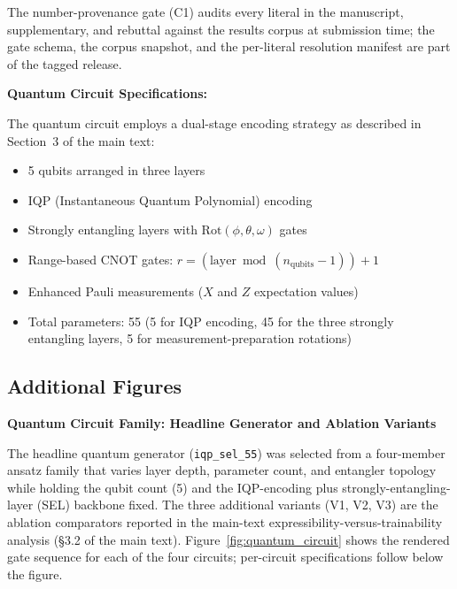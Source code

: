 The number-provenance gate (C1) audits every literal in the manuscript,
supplementary, and rebuttal against the results corpus at submission
time; the gate schema, the corpus snapshot, and the per-literal
resolution manifest are part of the tagged release.

\textbf{Quantum Circuit Specifications:}

The quantum circuit employs a dual-stage encoding strategy as described in Section~3 of the main text:
\begin{itemize}[nosep, leftmargin=*]
 \item 5 qubits arranged in three layers
 \item IQP (Instantaneous Quantum Polynomial) encoding
 \item Strongly entangling layers with $\text{Rot}(\phi, \theta, \omega)$ gates
 \item Range-based CNOT gates: $r = (\text{layer} \bmod (n_{\text{qubits}} - 1)) + 1$
 \item Enhanced Pauli measurements ($X$ and $Z$ expectation values)
 \item Total parameters: 55 (5 for IQP encoding, 45 for the three strongly entangling layers, 5 for measurement-preparation rotations)
\end{itemize}

\subsection{Additional Figures}

\textbf{Quantum Circuit Family: Headline Generator and Ablation Variants}

The headline quantum generator (\texttt{iqp\_sel\_55}) was selected from a
four-member ansatz family that varies layer depth, parameter count, and
entangler topology while holding the qubit count (5) and the IQP-encoding
plus strongly-entangling-layer (SEL) backbone fixed. The three additional
variants (V1, V2, V3) are the ablation comparators reported in the
main-text expressibility-versus-trainability analysis (§3.2 of the main
text). Figure~\ref{fig:quantum_circuit} shows the rendered gate sequence
for each of the four circuits; per-circuit specifications follow below
the figure.

